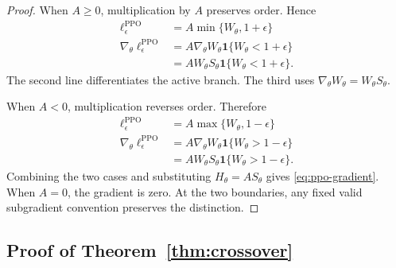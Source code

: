 \begin{proof}
When $A\ge0$, multiplication by $A$ preserves order.  Hence
\begin{align}
  \ell_\epsilon^{\mathrm{PPO}}
  &=A\min\{W_\theta,1+\epsilon\}
    \label{eq:ppo-positive-proof-1}\\
  \nabla_\theta\ell_\epsilon^{\mathrm{PPO}}
  &=A\nabla_\theta W_\theta
    \mathbf{1}\{W_\theta<1+\epsilon\}
    \label{eq:ppo-positive-proof-2}\\
  &=AW_\theta S_\theta
    \mathbf{1}\{W_\theta<1+\epsilon\}.
    \label{eq:ppo-positive-proof-3}
\end{align}
The second line differentiates the active branch.  The third uses
$\nabla_\theta W_\theta=W_\theta S_\theta$.

When $A<0$, multiplication reverses order.  Therefore
\begin{align}
  \ell_\epsilon^{\mathrm{PPO}}
  &=A\max\{W_\theta,1-\epsilon\}
    \label{eq:ppo-negative-proof-1}\\
  \nabla_\theta\ell_\epsilon^{\mathrm{PPO}}
  &=A\nabla_\theta W_\theta
    \mathbf{1}\{W_\theta>1-\epsilon\}
    \label{eq:ppo-negative-proof-2}\\
  &=AW_\theta S_\theta
    \mathbf{1}\{W_\theta>1-\epsilon\}.
    \label{eq:ppo-negative-proof-3}
\end{align}
Combining the two cases and substituting $H_\theta=AS_\theta$ gives
\eqref{eq:ppo-gradient}.  When $A=0$, the gradient is zero.  At the two
boundaries, any fixed valid subgradient convention preserves the distinction.
\end{proof}

\subsection{Proof of Theorem~\ref{thm:crossover}}

